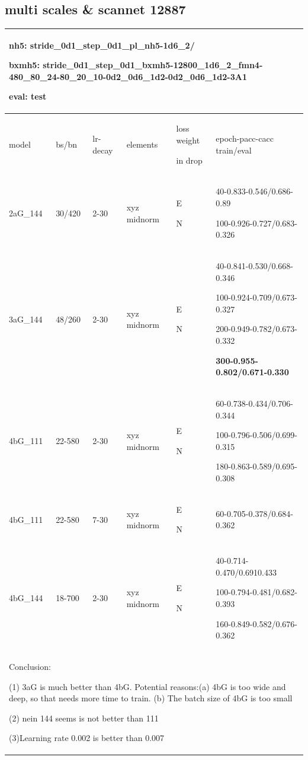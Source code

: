 \documentclass{article}
\begin{document}
\subsection{multi scales \& scannet 12887}
\begin{tabular}{|p{1.5cm}|p{1cm}|p{1cm}|p{2cm}|p{1cm}||p{5cm}| }
	\hline
	\multicolumn{6}{|p{12cm}|}{nh5: stride\_0d1\_step\_0d1\_pl\_nh5-1d6\_2/ \par bxmh5:  stride\_0d1\_step\_0d1\_bxmh5-12800\_1d6\_2\_fmn4-480\_80\_24-80\_20\_10-0d2\_0d6\_1d2-0d2\_0d6\_1d2-3A1
	\par eval: test } \\		
	\hline
	model & bs/bn& lr-decay & elements & loss weight\par in drop & epoch-pacc-cacc train/eval \\
	\hline
	2aG\_144 & 30/420 &2-30 & xyz midnorm & E\par N &40-0.833-0.546/0.686-0.89 \par 100-0.926-0.727/0.683-0.326\\
	\hline
	3aG\_144 & 48/260 &2-30 & xyz midnorm & E\par N &40-0.841-0.530/0.668-0.346 \par 100-0.924-0.709/0.673-0.327\par 200-0.949-0.782/0.673-0.332 \par \textbf{300-0.955-0.802/0.671-0.330} \\
	\hline 
	4bG\_111 & 22-580 & 2-30 & xyz midnorm & E \par N &60-0.738-0.434/0.706-0.344 \par 100-0.796-0.506/0.699-0.315\par 180-0.863-0.589/0.695-0.308 \\
	\hline
	4bG\_111 & 22-580 & 7-30 & xyz midnorm & E \par N &60-0.705-0.378/0.684-0.362 \\
	\hline
	4bG\_144 & 18-700 & 2-30 & xyz midnorm & E \par N &40-0.714-0.470/0.6910.433\par 100-0.794-0.481/0.682-0.393\par 160-0.849-0.582/0.676-0.362 \\
	
	\hline\hline
	\multicolumn{6}{|p{12cm}|}{ Conclusion:\par	(1) 3aG is much better than 4bG. Potential reasons:(a) 4bG is too wide and deep, so that needs more time to train. (b) The batch size of 4bG is too small \par (2) nein 144 seems is not better than 111 \par (3)Learning rate 0.002 is better than 0.007 } \\
	\hline
\end{tabular}	
\end{document}
